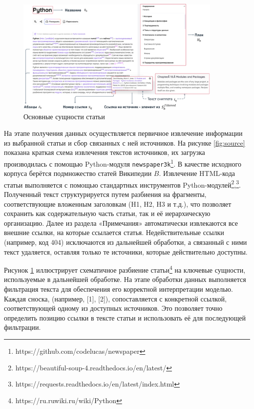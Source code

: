 \documentclass{article}
\begin{document}
\begin{figure}[ht!]
  \centering
  \includegraphics[width=0.9\textwidth]{figures/article_entities.png}
  \caption{Основные сущности статьи}
  \label{fig:article}
\end{figure}

На этапе получения данных осуществляется первичное извлечение информации из выбранной статьи и сбор связанных с ней источников. На рисунке \ref{fig:source} показана краткая схема извлечения текстов источников, 
их загрузка производилась с помощью Python-модуля \texttt{newspaper3k}\footnote{https://github.com/codelucas/newspaper}.
В качестве исходного корпуса берётся подмножество статей Википедии \(B\).
Извлечение HTML-кода статьи выполняется с помощью стандартных инструментов Python-модулей\footnote{https://beautiful-soup-4.readthedocs.io/en/latest/},\footnote{https://requests.readthedocs.io/en/latest/index.html}. 
Полученный текст структурируется путем разбиения на фрагменты, соответствующие вложенным заголовкам (H1, H2, H3 и т.д.), что позволяет сохранить как содержательную часть статьи, так и её иерархическую организацию. 
Далее из раздела «Примечания» автоматически извлекаются все внешние ссылки, на которые ссылается статья. Недействительные ссылки (например, код 404) исключаются из дальнейшей обработки,
а связанный с ними текст удаляется, оставляя только те источники, которые действительно доступны.

Рисунок \ref{fig:article} иллюстрирует схематичное разбиение статьи\footnote{https://ru.ruwiki.ru/wiki/Python} на ключевые сущности, используемые в дальнейшей обработке.
На этапе обработки данных выполняется фильтрация текста для обеспечения его корректной интерпретации моделью. 
Каждая сноска, (например, [1], [2]), сопоставляется с конкретной ссылкой, соответствующей одному из доступных источников. 
Это позволяет точно определить позицию ссылки в тексте статьи и использовать её для последующей фильтрации. 
\end{document}
